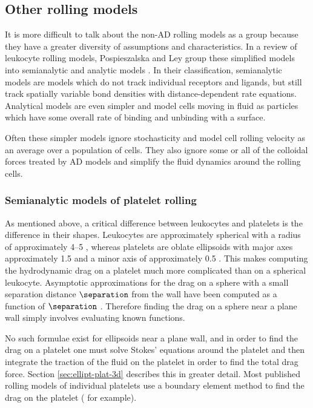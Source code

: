 \subsection{Other rolling models}
\label{sec:other-models}

It is more difficult to talk about the non-AD rolling models as a
group because they have a greater diversity of assumptions and
characteristics. In a review of leukocyte rolling models,
Pospieszalska and Ley group these simplified models into semianalytic
and analytic models \cite{Pospieszalska2009}. In their classification,
semianalytic models are models which do not track individual receptors
and ligands, but still track spatially variable bond densities with
distance-dependent rate equations. Analytical models are even simpler
and model cells moving in fluid as particles which have some overall
rate of binding and unbinding with a surface.

Often these simpler models ignore stochasticity and model cell rolling
velocity as an average over a population of cells. They also ignore
some or all of the colloidal forces treated by AD models and simplify
the fluid dynamics around the rolling cells.

\subsubsection{Semianalytic models of platelet rolling}
\label{sec:semi-model-plat}

As mentioned above, a critical difference between leukocytes and
platelets is the difference in their shapes. Leukocytes are
approximately spherical with a radius of approximately 4--5
, whereas platelets are oblate ellipsoids with major
axes approximately 1.5  and a minor axis of
approximately 0.5 . This makes computing the
hydrodynamic drag on a platelet much more complicated than on a
spherical leukocyte. Asymptotic approximations for the drag on a
sphere with a small separation distance $\separation$ from the wall
have been computed as a function of $\separation$
\cite{Jeffrey1915,Brenner1961,Goldman1967a,Goldman1967b}. Therefore
finding the drag on a sphere near a plane wall simply involves
evaluating known functions.

No such formulae exist for ellipsoids near a plane wall, and in order
to find the drag on a platelet one must solve Stokes' equations around
the platelet and then integrate the traction of the fluid on the
platelet in order to find the total drag force. Section
\ref{sec:ellipt-plat-3d} describes this in greater detail. Most
published rolling models of individual platelets use a boundary
element method to find the drag on the platelet
(\cite{Fitzgibbon2014,Mody2008a,Mody2008b,Wang2013} for example).

